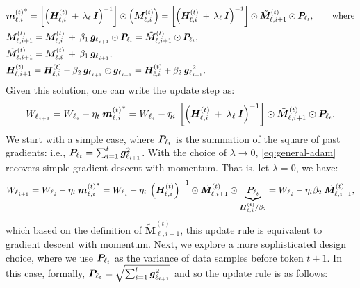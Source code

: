 \begin{align}\nonumber
    &{\boldsymbol{m}^{(t)}_{\ell, i}}^{*} = \left[  \left( \boldsymbol{H}^{(t)}_{\ell, i} \: + \: \lambda_{\ell}\: \boldsymbol{I} \right)^{-1}\right] \odot \left( \boldsymbol{M}^{(t)}_{\ell, i}\right) = \left[  \left( \boldsymbol{H}^{(t)}_{\ell, i} \: + \: \lambda_{\ell}\: \boldsymbol{I} \right)^{-1}\right] \odot \tilde{\boldsymbol{M}}^{(t)}_{\ell, i+1} \odot \boldsymbol{P}_{\ell_{t}}, \qquad \text{where} \\ \nonumber
    &\boldsymbol{M}^{(t)}_{\ell, i+1} = \boldsymbol{M}^{(t)}_{\ell, i} \: + \:  \beta_1 \: {\boldsymbol{g}_{\ell}}_{_{i + 1}} \odot \boldsymbol{P}_{\ell_{t}} = \tilde{\boldsymbol{M}}^{(t)}_{\ell, i+1} \odot \boldsymbol{P}_{\ell_{t}},\\ \nonumber
    &\tilde{\boldsymbol{M}}^{(t)}_{\ell, i+1} = \boldsymbol{M}^{(t)}_{\ell, i} \: + \:  \beta_1 \: {\boldsymbol{g}_{\ell}}_{_{i + 1}},\\ \label{eq:solution2}
    &\boldsymbol{H}^{(t)}_{\ell, i+1} = \boldsymbol{H}^{(t)}_{\ell, i} + \beta_2 \: {\boldsymbol{g}_{\ell}}_{_{i + 1}} \odot {\boldsymbol{g}_{\ell}}_{_{i + 1}} = \boldsymbol{H}^{(t)}_{\ell, i} + \beta_2 \: {\boldsymbol{g}_{\ell}}_{_{i + 1}}^{2}.
\end{align}
Given this solution, one can write the update step as:
\begin{align}\label{eq:general-adam}
    {W_{\ell}}_{_{i+1}} = {W_{\ell}}_{_{i}} - \eta_t \: {\boldsymbol{m}^{(t)}_{\ell, i}}^{*} = {W_{\ell}}_{_{i}} - \eta_i \: \left[  \left( \boldsymbol{H}^{(t)}_{\ell, i} \: + \: \lambda_{\ell}\: \boldsymbol{I} \right)^{-1}\right] \odot \tilde{\boldsymbol{M}}^{(t)}_{\ell, i+1} \odot \boldsymbol{P}_{\ell_{t}}. 
\end{align}
We start with a simple case, where $\boldsymbol{P}_{\ell_{t}}$ is the summation of the square of past gradients: i.e., $\boldsymbol{P}_{\ell_{t}} = \sum_{i = 1}^{t} \boldsymbol{g}_{\ell_{i+1}}^2$. With the choice of $\lambda \rightarrow 0$, \autoref{eq:general-adam} recovers simple gradient descent with momentum. That is, let $\lambda = 0$, we have:
\begin{align}
    {W_{\ell}}_{_{i+1}} = {W_{\ell}}_{_{i}} - \eta_t \: {\boldsymbol{m}^{(t)}_{\ell, i}}^{*} = {W_{\ell}}_{_{i}} - \eta_i \:  \left( \boldsymbol{H}^{(t)}_{\ell, i} \right)^{-1} \odot \tilde{\boldsymbol{M}}^{(t)}_{\ell, i+1} \odot \underset{\boldsymbol{H}^{(t)}_{\ell, i} / \beta_2}{\underbrace{\boldsymbol{P}_{\ell_{t}}}} = {W_{\ell}}_{_{i}} - \eta_t \beta_2 \: \tilde{\boldsymbol{M}}^{(t)}_{\ell, i+1},
\end{align}
which based on the definition of $\tilde{\boldsymbol{M}}^{(t)}_{\ell, i+1}$, this update rule is equivalent to gradient descent with momentum. Next, we explore a more sophisticated design choice, where we use $\boldsymbol{P}_{\ell_{t}}$ as the variance of data samples before token $t + 1$. In this case, formally,  $\boldsymbol{P}_{\ell_{t}} = \sqrt{\sum_{i = 1}^{t} \boldsymbol{g}_{\ell_{i+1}}^2}$ and so the update rule is as follows:

